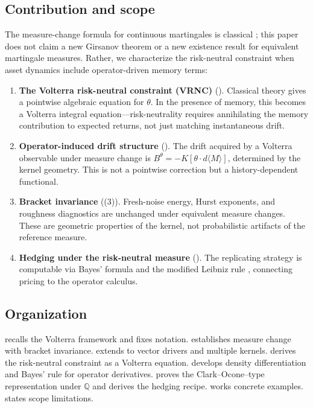 \documentclass[11pt]{article}
\theoremstyle{plain}
\theoremstyle{definition}
\theoremstyle{remark}
\newcommand{\QQ}{\mathbb{Q}}
\newcommand{\bracket}[1]{\langle #1 \rangle}
\begin{document}
\subsection{Contribution and scope}

The measure-change formula for continuous martingales is classical
\cite{KaratzasShreve1991, JacodShiryaev2003}; this paper does not claim
a new Girsanov theorem or a new existence result for equivalent martingale
measures. Rather, we characterize the risk-neutral constraint when asset
dynamics include operator-driven memory terms:

\begin{enumerate}[label=(\roman*)]
\item \textbf{The Volterra risk-neutral constraint (VRNC)} ().
Classical theory gives a pointwise algebraic equation for $\theta$. In the
presence of memory, this becomes a Volterra integral equation---risk-neutrality
requires annihilating the memory contribution to expected returns, not just
matching instantaneous drift.

\item \textbf{Operator-induced drift structure} ().
The drift acquired by a Volterra observable under measure change is
$B^\theta = -K[\theta \cdot d\bracket{M}]$, determined by the kernel geometry.
This is not a pointwise correction but a history-dependent functional.

\item \textbf{Bracket invariance} ((3)).
Fresh-noise energy, Hurst exponents, and roughness diagnostics are unchanged
under equivalent measure changes. These are geometric properties of the kernel,
not probabilistic artifacts of the reference measure.

\item \textbf{Hedging under the risk-neutral measure} ().
The replicating strategy is computable via Bayes' formula and the modified
Leibniz rule \cite{Fontes2026g}, connecting pricing to the operator calculus.
\end{enumerate}

\subsection{Organization}

 recalls the Volterra framework and fixes notation.
 establishes measure change with bracket invariance.
 extends to vector drivers and multiple kernels.
 derives the risk-neutral constraint as a Volterra equation.
 develops density differentiation and Bayes' rule for
operator derivatives.  proves the Clark--Ocone--type
representation under $\QQ$ and derives the hedging recipe.  works concrete examples.
 states scope limitations.
\end{document}
